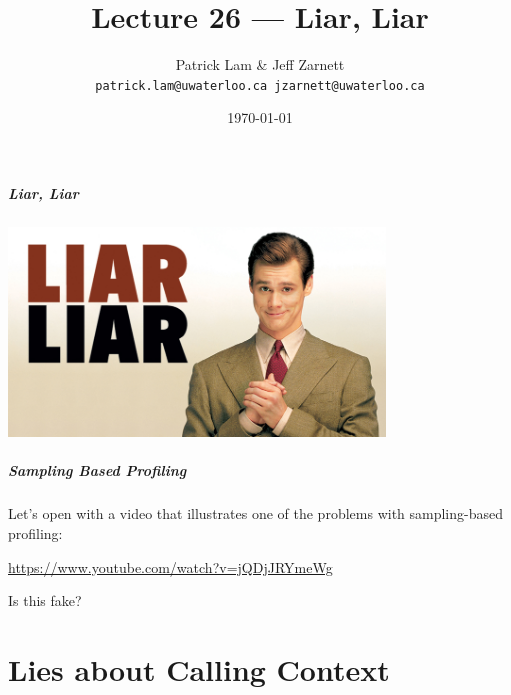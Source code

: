 

\title{Lecture 26 --- Liar, Liar }

\author{Patrick Lam \& Jeff Zarnett \\ \small \texttt{patrick.lam@uwaterloo.ca jzarnett@uwaterloo.ca}}
\date{\today}




\begin{frame}
  \titlepage

 \end{frame}



\begin{frame}
\frametitle{Liar, Liar}

\begin{center}
	\includegraphics[width=0.75\textwidth]{images/Liar-Liar.jpg}
\end{center}


\end{frame}

\begin{frame}
\frametitle{Sampling Based Profiling}

Let's open with a video that illustrates one of the problems with sampling-based profiling:

\begin{center}
	\url{https://www.youtube.com/watch?v=jQDjJRYmeWg}
\end{center}

Is this fake?

\end{frame}

\part{Lies about Calling Context}

\begin{frame}
  \partpage
\end{frame}

